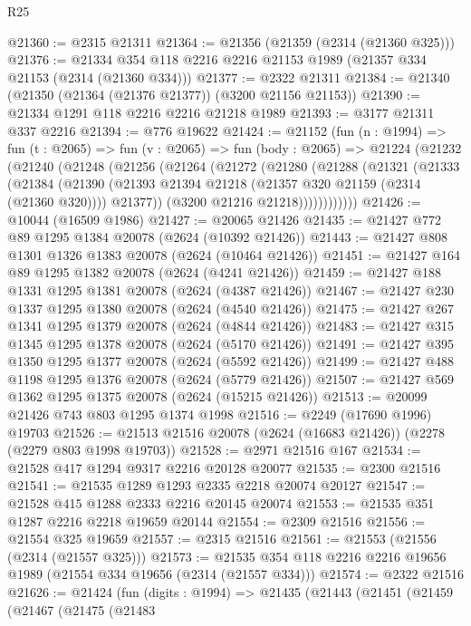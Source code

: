 \begin{lexlean}{R25}
\begin{coremodule}
@21360 := @2315 @21311
@21364 := @21356 (@21359 (@2314 (@21360 @325)))
@21376 := @21334 @354 @118 @2216 @2216 @21153 @1989 (@21357 @334 @21153 (@2314 (@21360 @334)))
@21377 := @2322 @21311
@21384 := @21340 (@21350 (@21364 (@21376 @21377)) (@3200 @21156 @21153))
@21390 := @21334 @1291 @118 @2216 @2216 @21218 @1989
@21393 := @3177 @21311 @337 @2216
@21394 := @776 @19622
@21424 := @21152
    (fun (n : @1994) =>
    fun (t : @2065) =>
    fun (v : @2065) =>
    fun (body : @2065) =>
    @21224
      (@21232
        (@21240
          (@21248
            (@21256
              (@21264
                (@21272
                  (@21280
                    (@21288
                      (@21321
                        (@21333
                          (@21384
                            (@21390
                              (@21393 @21394 @21218 (@21357 @320 @21159 (@2314 (@21360 @320))))
                              @21377))
                          (@3200 @21216 @21218))))))))))))
@21426 := @10044 (@16509 @1986)
@21427 := @20065 @21426
@21435 := @21427 @772 @89 @1295 @1384 @20078 (@2624 (@10392 @21426))
@21443 := @21427 @808 @1301 @1326 @1383 @20078 (@2624 (@10464 @21426))
@21451 := @21427 @164 @89 @1295 @1382 @20078 (@2624 (@4241 @21426))
@21459 := @21427 @188 @1331 @1295 @1381 @20078 (@2624 (@4387 @21426))
@21467 := @21427 @230 @1337 @1295 @1380 @20078 (@2624 (@4540 @21426))
@21475 := @21427 @267 @1341 @1295 @1379 @20078 (@2624 (@4844 @21426))
@21483 := @21427 @315 @1345 @1295 @1378 @20078 (@2624 (@5170 @21426))
@21491 := @21427 @395 @1350 @1295 @1377 @20078 (@2624 (@5592 @21426))
@21499 := @21427 @488 @1198 @1295 @1376 @20078 (@2624 (@5779 @21426))
@21507 := @21427 @569 @1362 @1295 @1375 @20078 (@2624 (@15215 @21426))
@21513 := @20099 @21426 @743 @803 @1295 @1374 @1998
@21516 := @2249 (@17690 @1996) @19703
@21526 := @21513 @21516 @20078 (@2624 (@16683 @21426)) (@2278 (@2279 @803 @1998 @19703))
@21528 := @2971 @21516 @167
@21534 := @21528 @417 @1294 @9317 @2216 @20128 @20077
@21535 := @2300 @21516
@21541 := @21535 @1289 @1293 @2335 @2218 @20074 @20127
@21547 := @21528 @415 @1288 @2333 @2216 @20145 @20074
@21553 := @21535 @351 @1287 @2216 @2218 @19659 @20144
@21554 := @2309 @21516
@21556 := @21554 @325 @19659
@21557 := @2315 @21516
@21561 := @21553 (@21556 (@2314 (@21557 @325)))
@21573 := @21535 @354 @118 @2216 @2216 @19656 @1989 (@21554 @334 @19656 (@2314 (@21557 @334)))
@21574 := @2322 @21516
@21626 := @21424
    (fun (digits : @1994) =>
    @21435
      (@21443
        (@21451
          (@21459
            (@21467
              (@21475
                (@21483

\end{coremodule}
\end{lexlean}
